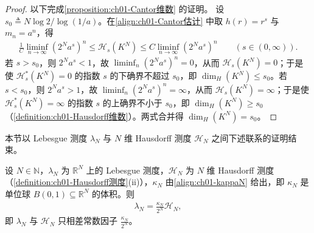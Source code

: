 \documentclass[../../main.tex]{subfiles}%
\begin{document}
\begin{proof}
以下完成\cref{proposition:ch01-Cantor维数} 的证明。
设 $s_0\triangleq N\log2/\log(1/a)$。在\eqref{align:ch01-Cantor估计} 中取 $h(r)=r^s$ 与 $m_n=a^n$，得
\begin{align*}
\frac{1}{C}\liminf_{n\to\infty}\left(2^Na^s\right)^n\leqslant\mathcal{H}_s(K^N)\leqslant C\liminf_{n\to\infty}\left(2^Na^s\right)^n\qquad(s\in(0,\infty)).
\end{align*}
若 $s>s_0$，则 $2^Na^s<1$，故 $\liminf_n\left(2^Na^s\right)^n=0$，从而 $\mathcal{H}_s(K^N)=0$；于是使 $\mathcal{H}_s^*(K^N)=0$ 的指数 $s$ 的下确界不超过 $s_0$，即 $\dim_H(K^N)\leqslant s_0$。若 $s<s_0$，则 $2^Na^s>1$，故 $\liminf_n\left(2^Na^s\right)^n=\infty$，从而 $\mathcal{H}_s(K^N)=\infty$；于是使 $\mathcal{H}_s^*(K^N)=\infty$ 的指数 $s$ 的上确界不小于 $s_0$，即 $\dim_H(K^N)\geqslant s_0$（\cref{definition:ch01-Hausdorff维数}）。两式合并得 $\dim_H(K^N)=s_0$。
\end{proof}

本节以 Lebesgue 测度 $\lambda_N$ 与 $N$ 维 Hausdorff 测度 $\mathcal{H}_N$ 之间下述联系的证明结束。

\begin{theorem}\label{theorem:ch01-Lebesgue-Hausdorff}
设 $N\in\mathbb{N}$，$\lambda_N$ 为 $\mathbb{R}^N$ 上的 Lebesgue 测度，$\mathcal{H}_N$ 为 $N$ 维 Hausdorff 测度（\cref{definition:ch01-Hausdorff测度}(ii)），$\kappa_N$ 由\eqref{align:ch01-kappaN} 给出，即 $\kappa_N$ 是单位球 $B(0,1)\subseteq\mathbb{R}^N$ 的体积。则
\begin{align*}
\lambda_N=\frac{\kappa_N}{2^N}\mathcal{H}_N ,
\end{align*}
即 $\lambda_N$ 与 $\mathcal{H}_N$ 只相差常数因子 $\frac{\kappa_N}{2^N}$。
\end{theorem}
\end{document}
